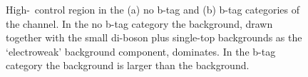 \begin{figure}[h!]
\begin{center}
\end{center}
\caption[High-\mT~control region in the no b-tag and b-tag
categories of the \etau channel.]{High-\mT~control region in the (a) no b-tag and (b) b-tag categories of the \etau
channel. In the no b-tag category the \Wjets background, drawn together with the small
 di-boson plus single-top backgrounds as the `electroweak' background component, dominates. In the b-tag
category the \ttbar background is larger than the \Wjets background.}
\label{fig:bkgs_highmtctrl}
\end{figure}

